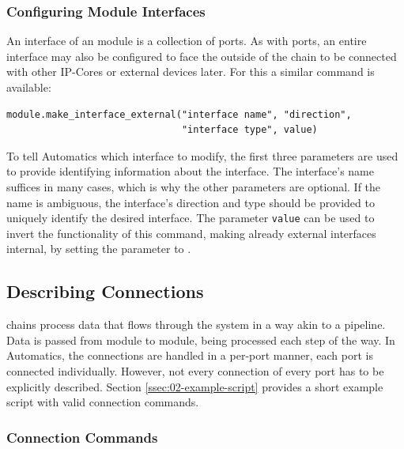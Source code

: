 \subsubsection{Configuring Module Interfaces}

An interface of an \asterics module is a collection of ports.
As with ports, an entire interface may also be configured to face the outside of the \asterics chain to be connected with other IP-Cores or external devices later.
For this a similar command is available:
\begin{lstlisting}[style=AutomaticsPython]
module.make_interface_external("interface name", "direction",
                               "interface type", value)
\end{lstlisting}
To tell Automatics which interface to modify, the first three parameters are used to provide identifying information about the interface.
The interface's name suffices in many cases, which is why the other parameters are optional.
If the name is ambiguous, the interface's direction and type should be provided to uniquely identify the desired interface.
The parameter \texttt{value} can be used to invert the functionality of this command, making already external interfaces internal, by setting the parameter to .

\subsection{Describing Connections}
\label{ssec:02-connecting}

\asterics chains process data that flows through the system in a way akin to a pipeline.
Data is passed from module to module, being processed each step of the way.
In Automatics, the connections are handled in a per-port manner, each port is connected individually.
However, not every connection of every port has to be explicitly described.
Section \ref{ssec:02-example-script} provides a short example script with valid connection commands.

\subsubsection{Connection Commands}

